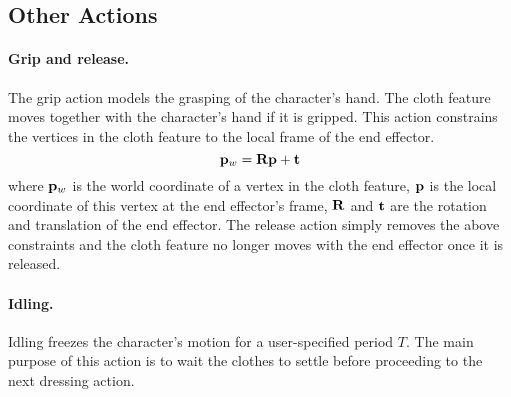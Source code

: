 \subsection{Other Actions}

\paragraph{Grip and release.}
The grip action models the grasping of the character's hand. The cloth feature moves together with the character's hand if it is gripped. This action constrains the vertices in the cloth feature to the local frame of the end effector.
\begin{displaymath}
\mathbf{p}_w = \mathbf{Rp} + \mathbf{t}
\end{displaymath}
where $\mathbf{p}_w$ is the world coordinate of a vertex in the cloth feature, $\mathbf{p}$ is the local coordinate of this vertex at the end effector's frame, $\mathbf{R}$ and $\mathbf{t}$ are the rotation and translation of the end effector. The release action simply removes the above constraints and the cloth feature no longer moves with the end effector once it is released.

\paragraph{Idling.} Idling freezes the character's motion for a user-specified period $T$. The main purpose of this action is to wait the clothes to settle before proceeding to the next dressing action.

